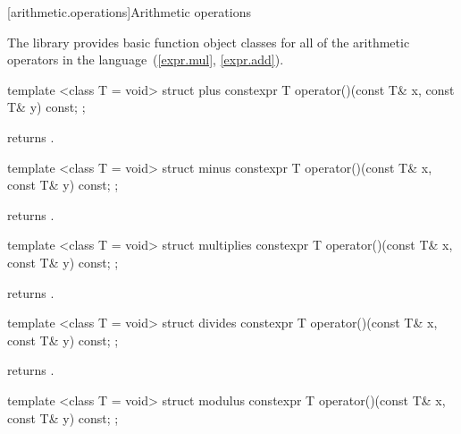 \begin{itemdescr}
\pnum\returns {}
\end{itemdescr}

[arithmetic.operations]{Arithmetic operations}

\pnum
The library provides basic function object classes for all of the arithmetic
operators in the language~(\ref{expr.mul}, \ref{expr.add}).

%
\begin{itemdecl}
template <class T = void> struct plus {
  constexpr T operator()(const T& x, const T& y) const;
};
\end{itemdecl}

\begin{itemdescr}
\pnum
{}
returns
.
\end{itemdescr}

%
\begin{itemdecl}
template <class T = void> struct minus {
  constexpr T operator()(const T& x, const T& y) const;
};
\end{itemdecl}

\begin{itemdescr}
\pnum
{}
returns
.
\end{itemdescr}

%
\begin{itemdecl}
template <class T = void> struct multiplies {
  constexpr T operator()(const T& x, const T& y) const;
};
\end{itemdecl}

\begin{itemdescr}
\pnum
{}
returns
.
\end{itemdescr}

%
\begin{itemdecl}
template <class T = void> struct divides {
  constexpr T operator()(const T& x, const T& y) const;
};
\end{itemdecl}

\begin{itemdescr}
\pnum
{}
returns
.
\end{itemdescr}

%
\begin{itemdecl}
template <class T = void> struct modulus {
  constexpr T operator()(const T& x, const T& y) const;
};
\end{itemdecl}

